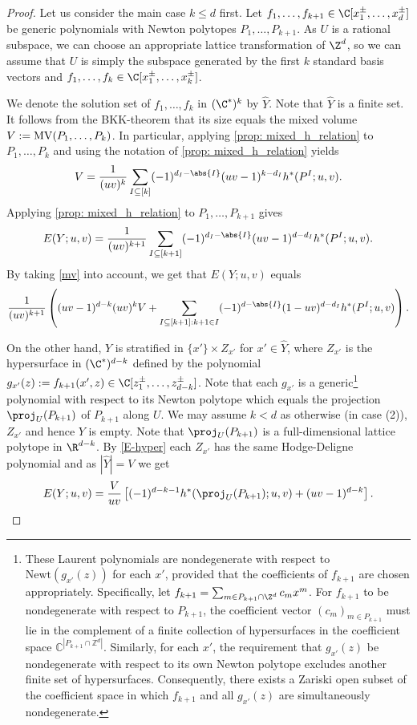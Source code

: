 \documentclass[reqno, 11pt, a4paper, oneside]{amsart}
\def\MV{{\rm MV}}
\begin{document}
\begin{proof}
Let us consider the main case $k\leq d$ first. 
Let $f_1, \ldots, f_{k+1} \in \C[x^\pm_1, \ldots, x^\pm_d]$ be generic polynomials with Newton polytopes $P_1,\ldots, P_{k+1}$. As $U$ is a rational subspace, we can choose an appropriate lattice transformation of $\Z^d$, so we can assume that $U$ is simply the subspace generated by the first $k$ standard basis vectors and $f_1, \ldots, f_k \in \C[x^\pm_1, \ldots, x^\pm_k]$.


We denote the solution set of $f_1, \ldots, f_k$ in $(\C^*)^k$ by $\hat{Y}$. Note that $\hat{Y}$ is a finite set. It follows from the BKK-theorem that its size equals the mixed volume $V := \MV(P_1, \ldots, P_k)$. In particular, applying \cref{prop: mixed_h_relation} to $P_1, \ldots, P_k$ and using the notation of \cref{prop: mixed_h_relation} yields
   \begin{equation}V =\frac{1}{(uv)^k} \sum_{I \subseteq[k]} (-1)^{d_I -\abs{I}} (uv-1)^{k-d_I} h^*(P^I; u,v).\label{mv}\end{equation}   
Applying \cref{prop: mixed_h_relation} to $P_1, \ldots, P_{k+1}$ gives
   \[ E (Y; u,v) =\frac{1}{(uv)^{k+1}} \sum_{I \subseteq[k+1]} (-1)^{d_I -\abs{I}} (uv-1)^{d-d_I} h^*(P^I; u,v).\]
By taking \eqref{mv} into account, we get that $E(Y; u,v)$ equals
\begin{equation}
\frac{1}{(uv)^{k+1}} \left((uv-1)^{d-k} (uv)^k V + \sum_{I \subseteq[k+1]: k+1 \in I} (-1)^{d -\abs{I}} (1-uv)^{d-d_I} h^*(P^I; u,v)\right).
\label{E-eq1}
\end{equation}


On the other hand, $Y$ is stratified in $\{x'\} \times Z_{x'}$ for $x' \in \hat{Y}$, where $Z_{x'}$ is the hypersurface in $(\C^*)^{d-k}$ defined by the polynomial $g_{x'}(z):=f_{k+1}(x',z) \in \C[z^\pm_1, \ldots, z^\pm_{d-k}]$. Note that each $g_{x'}$ is a generic\footnote{
These Laurent polynomials are nondegenerate with respect to  $\text{Newt}(g_{x'}(z))$ for each $x'$, provided that the coefficients of $f_{k+1}$ are chosen appropriately. Specifically, let $f_{k+1}= \sum_{m \in P_{k+1} \cap \Z^d} c_m x^m$. For $f_{k+1}$ to be nondegenerate with respect to $P_{k+1}$, the coefficient vector $(c_m)_{m \in P_{k+1}}$ must lie in the complement of a finite collection of hypersurfaces in the coefficient space $\mathbb{C}^{|P_{k+1} \cap \mathbb{Z}^d|}$. Similarly, for each $x'$, the requirement that $g_{x'}(z)$ be nondegenerate with respect to its own Newton polytope excludes another finite set of hypersurfaces. Consequently, there exists a Zariski open subset of the coefficient space in which $f_{k+1}$ and all $g_{x'}(z)$ are simultaneously nondegenerate. } polynomial with respect to its Newton polytope which equals the projection $\proj_U(P_{k+1})$ of $P_{k+1}$ along $U$.  We may assume $k<d$ as otherwise (in case (2)), $Z_{x'}$ and hence $Y$ is empty. Note that $\proj_U(P_{k+1})$ is a full-dimensional lattice polytope in $\R^{d-k}$. By \eqref{E-hyper} each $Z_{x'}$ has the same Hodge-Deligne polynomial and as $|\hat{Y}|=V$ we get
\begin{equation}
E (Y; u,v) =  \frac{V}{uv} \left[(-1)^{d-k-1} h^*(\proj_U(P_{k+1}); u,v) + (uv- 1)^{d-k} \right].
\label{E-eq2}
\end{equation}


\end{proof}
\end{document}
